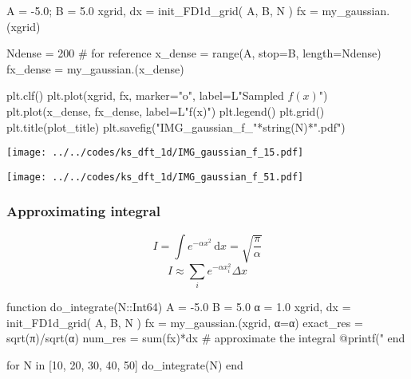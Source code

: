 \begin{frame}[fragile]

\begin{juliacode}
A = -5.0; B =  5.0
xgrid, dx = init_FD1d_grid( A, B, N )
fx = my_gaussian.(xgrid)

Ndense = 200 # for reference
x_dense = range(A, stop=B, length=Ndense)
fx_dense = my_gaussian.(x_dense)

plt.clf()
plt.plot(xgrid, fx, marker="o", label=L"Sampled $f(x)$")
plt.plot(x_dense, fx_dense, label=L"f(x)")
plt.legend()
plt.grid()
plt.title(plot_title)
plt.savefig("IMG_gaussian_f_"*string(N)*".pdf")
\end{juliacode}

\end{frame}


\begin{frame}

{\centering
\texttt{[image: ../../codes/ks\_dft\_1d/IMG\_gaussian\_f\_15.pdf]}
\par}

\end{frame}


\begin{frame}

{\centering
\texttt{[image: ../../codes/ks\_dft\_1d/IMG\_gaussian\_f\_51.pdf]}
\par}

\end{frame}


\begin{frame}[fragile]
\frametitle{Approximating integral}

\begin{equation*}
I = \int e^{-\alpha x^2}\, \mathrm{d}x = \sqrt{ \frac{\pi}{\alpha} }
\end{equation*}
\begin{equation*}
I \approx \sum_{i} e^{-\alpha x_{i}^2} \Delta x
\end{equation*}

\begin{juliacode}
function do_integrate(N::Int64)
    A = -5.0
    B = 5.0
    α = 1.0
    xgrid, dx = init_FD1d_grid( A, B, N )
    fx = my_gaussian.(xgrid, α=α)
    exact_res = sqrt(π)/sqrt(α)
    num_res = sum(fx)*dx # approximate the integral
    @printf("%
end

for N in [10, 20, 30, 40, 50]
    do_integrate(N)
end
\end{juliacode}

\end{frame}



